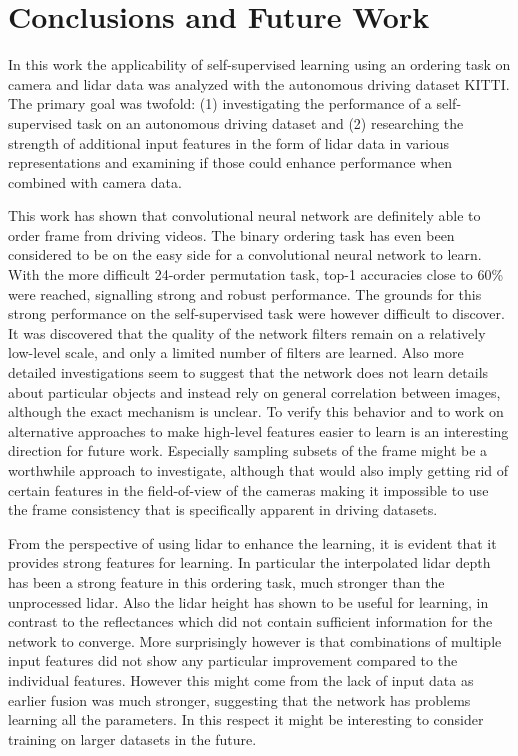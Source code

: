 %

\chapter{Conclusions and Future Work}
\label{ch:conclusion}
In this work the applicability of self-supervised learning using an ordering task on camera and lidar data was analyzed with the autonomous driving dataset KITTI\cite{geiger2012}. The primary goal was twofold: (1) investigating the performance of a self-supervised task on an autonomous driving dataset and (2) researching the strength of additional input features in the form of lidar data in various representations and examining if those could enhance performance when combined with camera data.

This work has shown that convolutional neural network are definitely able to order frame from driving videos. The binary ordering task has even been considered to be on the easy side for a convolutional neural network to learn. With the more difficult 24-order permutation task, top-1 accuracies close to 60\% were reached, signalling strong and robust performance. The grounds for this strong performance on the self-supervised task were however difficult to discover. It was discovered that the quality of the network filters remain on a relatively low-level scale, and only a limited number of filters are learned. Also more detailed investigations seem to suggest that the network does not learn details about particular objects and instead rely on general correlation between images, although the exact mechanism is unclear. To verify this behavior and to work on alternative approaches to make high-level features easier to learn is an interesting direction for future work. Especially sampling subsets of the frame might be a worthwhile approach to investigate, although that would also imply getting rid of certain features in the field-of-view of the cameras making it impossible to use the frame consistency that is specifically apparent in driving datasets.  

From the perspective of using lidar to enhance the learning, it is evident that it provides strong features for learning. In particular the interpolated lidar depth has been a strong feature in this ordering task, much stronger than the unprocessed lidar. Also the lidar height has shown to be useful for learning, in contrast to the reflectances which did not contain sufficient information for the network to converge. More surprisingly however is that combinations of multiple input features did not show any particular improvement compared to the individual features. However this might come from the lack of input data as earlier fusion was much stronger, suggesting that the network has problems learning all the parameters. In this respect it might be interesting to consider training on larger datasets in the future.

